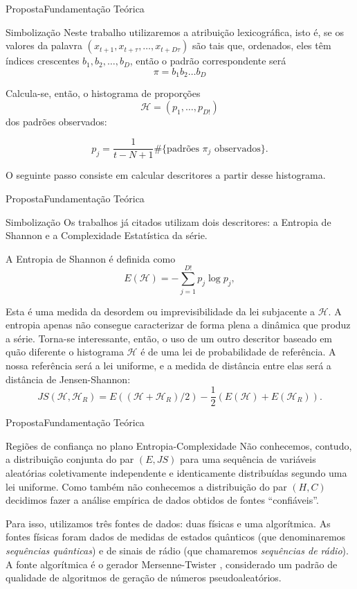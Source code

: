\documentclass[10pt,xcolor={dvipsnames}]{beamer}
\begin{document}
\begin{frame}{Proposta}{Fundamentação Teórica}
\begin{block}{Simbolização}
	Neste trabalho utilizaremos a atribuição lexicográfica, isto é, se os valores da palavra $(x_{t+1},x_{t+\tau},\ldots, x_{t+D\tau})$ são tais que, ordenados, eles têm índices crescentes $b_1,b_2,\dots,b_D$, então o padrão correspondente será $$\pi=b_1b_2\dots b_D$$
	
	Calcula-se, então, o histograma de proporções $$\mathcal{H} =(p_1,\dots,p_{D!})$$ dos padrões observados:	
	\pause

		$$
		p_j = \frac{1}{t-N+1} \# \{
		\text{padrões } \pi_j \text{ observados}
		\}.
		$$
\pause

	O seguinte passo consiste em calcular descritores a partir desse histograma.
\end{block}
\end{frame}

\begin{frame}{Proposta}{Fundamentação Teórica}
\begin{block}{Simbolização}
Os trabalhos já citados utilizam dois descritores: a Entropia de Shannon e a Complexidade Estatística da série.

A Entropia de Shannon é definida como
$$
E(\mathcal H) = -\sum_{j=1}^{D!} p_j \log p_j,
$$

Esta é uma medida da desordem ou imprevisibilidade da lei subjacente a $\mathcal H$.
\pause
A entropia apenas não consegue caracterizar de forma plena a dinâmica que produz a série.
Torna-se interessante, então, o uso de um outro descritor baseado em quão diferente o histograma $\mathcal H$ é de uma lei de probabilidade de referência.
A nossa referência será a lei uniforme, e a medida de distância entre elas será a distância de Jensen-Shannon:
$$
JS(\mathcal H, \mathcal H_R) = E((\mathcal H+ \mathcal H_R)/2) -\frac{1}{2}(E(\mathcal H) + E(\mathcal H_R)).
$$
\end{block}
\end{frame}

\begin{frame}{Proposta}{Fundamentação Teórica}
	\begin{block}{Regiões de confiança no plano Entropia-Complexidade}
	Não conhecemos, contudo, a distribuição conjunta do par $(E,JS)$ para uma sequência de variáveis aleatórias coletivamente independente e identicamente distribuídas segundo uma lei uniforme.
	Como também não conhecemos a distribuição do par $(H,C)$ decidimos fazer a análise empírica de dados obtidos de fontes ``confiáveis''.
	\pause
	
	Para isso, utilizamos três fontes de dados: duas físicas e uma algorítmica.
	As fontes físicas foram dados de medidas de estados quânticos \cite{RNGVacuumStates} (que denominaremos \textit{sequências quânticas}) e de sinais de rádio \cite{RandomHostingAdvice} (que chamaremos \textit{sequências de rádio}).
	A fonte algorítmica é o gerador Mersenne-Twister \cite{Matsumoto98}, considerado um padrão de qualidade de algoritmos de geração de números pseudoaleatórios.
	\end{block}
\end{frame}
\end{document}
